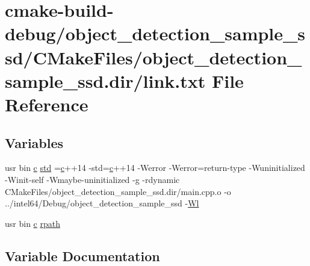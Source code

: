 \hypertarget{object__detection__sample__ssd_2CMakeFiles_2object__detection__sample__ssd_8dir_2link_8txt}{}\section{cmake-\/build-\/debug/object\+\_\+detection\+\_\+sample\+\_\+ssd/\+C\+Make\+Files/object\+\_\+detection\+\_\+sample\+\_\+ssd.dir/link.txt File Reference}
\label{object__detection__sample__ssd_2CMakeFiles_2object__detection__sample__ssd_8dir_2link_8txt}
\subsection*{Variables}
\begin{DoxyCompactItemize}
\item 
usr bin \hyperlink{CMakeCache_8txt_aac1d6a1710812201527c735f7c6afbaa}{c} \hyperlink{object__detection__sample__ssd_2CMakeFiles_2object__detection__sample__ssd_8dir_2link_8txt_a1ccfea5f558575a112db71eeb271fabf}{std} =\hyperlink{CMakeCache_8txt_aac1d6a1710812201527c735f7c6afbaa}{c}++14 -\/std=\hyperlink{CMakeCache_8txt_aac1d6a1710812201527c735f7c6afbaa}{c}++14 -\/Werror -\/Werror=return-\/type -\/Wuninitialized -\/Winit-\/self -\/Wmaybe-\/uninitialized -\/g -\/rdynamic C\+Make\+Files/object\+\_\+detection\+\_\+sample\+\_\+ssd.\+dir/main.\+cpp.\+o -\/o ../intel64/Debug/object\+\_\+detection\+\_\+sample\+\_\+ssd -\/\hyperlink{thirdparty_2extension_2CMakeFiles_2cpu__extension_8dir_2link_8txt_af9ccbf658ed2deb89d0d79f211e5b033}{Wl}
\item 
usr bin \hyperlink{CMakeCache_8txt_aac1d6a1710812201527c735f7c6afbaa}{c} \hyperlink{object__detection__sample__ssd_2CMakeFiles_2object__detection__sample__ssd_8dir_2link_8txt_ab9d7fd7120fafa2118a4e08c1df697c7}{rpath}
\end{DoxyCompactItemize}


\subsection{Variable Documentation}
